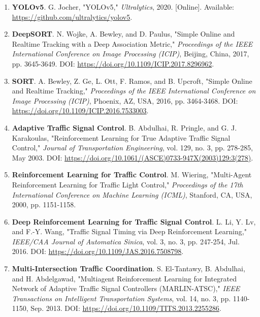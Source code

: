 \begin{enumerate}[resume]
    \item \textbf{YOLOv5}. G. Jocher, "YOLOv5," \textit{Ultralytics}, 2020. [Online]. 
    Available: \url{https://github.com/ultralytics/yolov5}.
    
    \item \textbf{DeepSORT}. N. Wojke, A. Bewley, and D. Paulus, "Simple Online and Realtime Tracking with a Deep Association Metric," 
    \textit{Proceedings of the IEEE International Conference on Image Processing (ICIP)}, 
    Beijing, China, 2017, pp. 3645-3649. DOI: \url{https://doi.org/10.1109/ICIP.2017.8296962}.
    
    \item \textbf{SORT}. A. Bewley, Z. Ge, L. Ott, F. Ramos, and B. Upcroft, "Simple Online and Realtime Tracking," 
    \textit{Proceedings of the IEEE International Conference on Image Processing (ICIP)}, 
    Phoenix, AZ, USA, 2016, pp. 3464-3468. DOI: \url{https://doi.org/10.1109/ICIP.2016.7533003}.
    
    \item \textbf{Adaptive Traffic Signal Control}. B. Abdulhai, R. Pringle, and G. J. Karakoulas, 
    "Reinforcement Learning for True Adaptive Traffic Signal Control," 
    \textit{Journal of Transportation Engineering}, vol. 129, no. 3, pp. 278-285, May 2003. 
    DOI: \url{https://doi.org/10.1061/(ASCE)0733-947X(2003)129:3(278)}.
    
    \item \textbf{Reinforcement Learning for Traffic Control}. M. Wiering, "Multi-Agent Reinforcement Learning for Traffic Light Control," 
    \textit{Proceedings of the 17th International Conference on Machine Learning (ICML)}, 
    Stanford, CA, USA, 2000, pp. 1151-1158.
    
    \item \textbf{Deep Reinforcement Learning for Traffic Signal Control}. L. Li, Y. Lv, and F.-Y. Wang, 
    "Traffic Signal Timing via Deep Reinforcement Learning," 
    \textit{IEEE/CAA Journal of Automatica Sinica}, vol. 3, no. 3, pp. 247-254, Jul. 2016. 
    DOI: \url{https://doi.org/10.1109/JAS.2016.7508798}.
    
    \item \textbf{Multi-Intersection Traffic Coordination}. S. El-Tantawy, B. Abdulhai, and H. Abdelgawad, 
    "Multiagent Reinforcement Learning for Integrated Network of Adaptive Traffic Signal Controllers (MARLIN-ATSC)," 
    \textit{IEEE Transactions on Intelligent Transportation Systems}, vol. 14, no. 3, pp. 1140-1150, Sep. 2013. 
    DOI: \url{https://doi.org/10.1109/TITS.2013.2255286}.
    

\end{enumerate}
